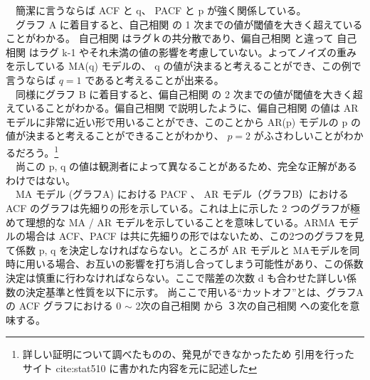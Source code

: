\documentclass{scrartcl}
\begin{document}
　簡潔に言うならば ACF と q、 PACF と p が強く関係している。\\
　グラフ A に着目すると、自己相関 の 1 次までの値が閾値を大きく超えていることがわかる。 自己相関 はラグｋの共分散であり、偏自己相関 と違って 自己相関 はラグ k-1 やそれ未満の値の影響を考慮していない。よってノイズの重みを示している MA(q) モデルの、 q の値が決まると考えることができ、この例で言うならば \(q = 1\) であると考えることが出来る。\\
　同様にグラフ B に着目すると、偏自己相関 の 2 次までの値が閾値を大きく超えていることがわかる。偏自己相関 で説明したように、偏自己相関 の値は AR モデルに非常に近い形で用いることができ、このことから AR(p) モデルの p の値が決まると考えることができることがわかり、 \(p = 2\) がふさわしいことがわかるだろう。\footnote{詳しい証明について調べたものの、発見ができなかったため 引用を行ったサイト cite:stat510 に書かれた内容を元に記述した}\\
　尚この p, q の値は観測者によって異なることがあるため、完全な正解があるわけではない。\\
　MA モデル (グラフA) における PACF 、 AR モデル（グラフB）における ACF のグラフは先細りの形を示している。これは上に示した 2 つのグラフが極めて理想的な MA / AR モデルを示していることを意味している。ARMA モデルの場合は ACF、PACF は共に先細りの形ではないため、この2つのグラフを見て係数 p, q を決定しなければならない。ところが AR モデルと MAモデルを同時に用いる場合、お互いの影響を打ち消し合ってしまう可能性があり、この係数決定は慎重に行わなければならない。ここで階差の次数 d も合わせた詳しい係数の決定基準と性質を以下に示す。\cite{acf-pacf} 尚ここで用いる``カットオフ''とは、グラフAの ACF グラフにおける 0 \(\sim\) 2次の自己相関 から ３次の自己相関 への変化を意味する。\\
\end{document}
